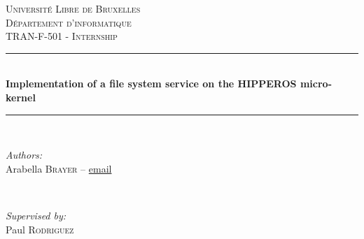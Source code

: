 \documentclass[12pt]{article}
\begin{document}
\begin{titlepage}

\def\EMAILArabella{Arabella.Brayer@ulb.ac.be}

\newcommand{\imagepath}{../img}
\newcommand{\university}{Université Libre de Bruxelles}
\newcommand{\faculty}{Département d'informatique}
\newcommand{\course}{TRAN-F-501 - Internship}
\newcommand{\authors}{\bfseries{Arabella \textsc{Brayer}} -- \emailArabella}
\newcommand{\supervisor}{Paul \textsc{Rodriguez}}
\newcommand{\HRule}{\rule{\linewidth}{0.5mm}} %
\newcommand{\emailArabella}{\href{mailto:\EMAILArabella?subject=[TRAN-F-501 - Internship]}{\color{\EMAILArabella}\path|\EMAILArabella|}}
\center %
 

\textsc{\LARGE \university}\\[1.5cm] %
\textsc{\Large \faculty}\\[0.5cm] %
\textsc{\large \course}\\[0.5cm] %

\HRule \\[0.4cm]
{ \huge \bfseries Implementation of a file system service on the HIPPEROS micro-kernel}\\[0.4cm] %
\HRule \\[1.5cm]
 

\begin{minipage}{0.4\textwidth}
\begin{flushleft} \large
\emph{Authors:}\\
Arabella \textsc{Brayer} -- \href{mailto:Arabella.Brayer@ulb.ac.be?subject=[TRAN-F-501 - Internship]}{email}
\end{flushleft}
\end{minipage}
~
\begin{minipage}{0.4\textwidth}
\begin{flushright} \large
\emph{Supervised by:} \\
\supervisor %
\end{flushright}
\end{minipage}\\[2cm]



\end{titlepage}
\end{document}
